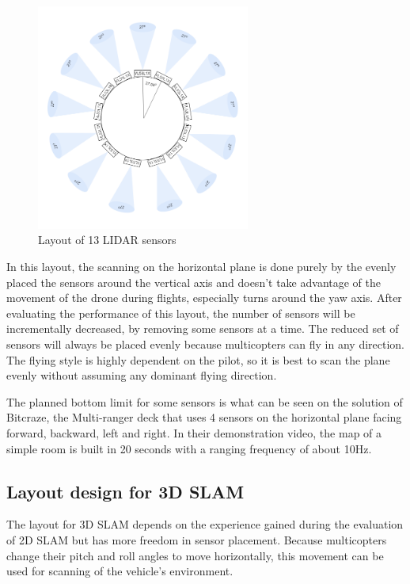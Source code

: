 \begin{figure}[ht]
    \centering
    \includegraphics[width=70mm, keepaspectratio]{figures/2d_slam_13sensors.png}
    \caption{Layout of 13 LIDAR sensors}
    \label{fig:2d_13sensor_layout}
\end{figure}

In this layout, the scanning on the horizontal plane is done purely by the evenly placed the sensors
around the vertical axis and doesn't take advantage of the movement of the drone during flights, especially
turns around the yaw axis. After evaluating the performance of this layout, the number of sensors will be
incrementally decreased, by removing some sensors at a time. The reduced set of sensors will always
be placed evenly because multicopters can fly in any direction. The flying style is highly dependent on the
pilot, so it is best to scan the plane evenly without assuming any dominant flying direction.

The planned bottom limit for some sensors is what can be seen on the solution of Bitcraze,
the Multi-ranger deck\cite{BitcrazeMultirangerDeck} that uses 4 sensors on the horizontal plane facing forward,
backward, left and right. In their demonstration video, the map of a simple room is built in 20 seconds
with a ranging frequency of about 10Hz.

\subsection{Layout design for 3D SLAM}
The layout for 3D SLAM depends on the experience gained during the evaluation of 2D SLAM but has more
freedom in sensor placement. Because multicopters change their pitch and roll angles to move horizontally,
this movement can be used for scanning of the vehicle's environment.

